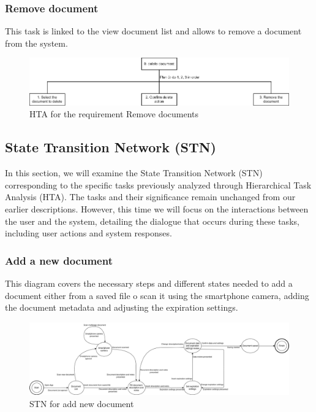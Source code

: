 \subsubsection{Remove document}
This task is linked to the view document list and allows to remove a document from the system.
\begin{figure}[H]
	\centering
	\includegraphics[width=\textwidth]{../Draw.io diagrams/delete_document.drawio.png}  %
	\caption{HTA for the requirement Remove documents}
\end{figure}
\subsection{State Transition Network (STN)}
In this section, we will examine the State Transition Network (STN) corresponding to the specific tasks previously analyzed through Hierarchical Task Analysis (HTA). The tasks and their significance remain unchanged from our earlier descriptions. However, this time we will focus on the interactions between the user and the system, detailing the dialogue that occurs during these tasks, including user actions and system responses.
\subsubsection{Add a new document}
This diagram covers the necessary steps and different states needed to add a document either from a saved file o scan it using the smartphone camera, adding the document metadata and adjusting the expiration settings.
\begin{figure}[H]
	\centering
	\includegraphics[width=\textwidth]{../Draw.io diagrams/documnet_add_STN.drawio.png}  %
	\caption{STN for add new document}
\end{figure}

